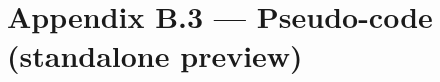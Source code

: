 \documentclass[11pt]{article}
\begin{document}
\appendix
\setcounter{section}{2}   %
\section*{Appendix B.3 --- Pseudo-code (standalone preview)}


\end{document}
